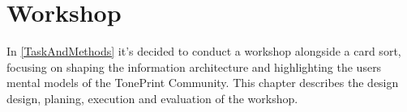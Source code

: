 \chapter{Workshop}
\label{ChapterWorkshop}
In \autoref{TaskAndMethods} it's decided to conduct a workshop alongside a card sort, focusing on shaping the information architecture and highlighting the users mental models of the TonePrint Community. This chapter describes the design design, planing, execution and evaluation of the workshop.